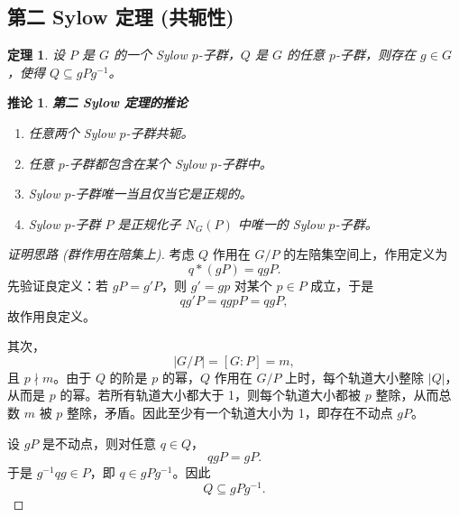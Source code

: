 \documentclass[11pt,a4paper]{ctexart}
\newtheorem*{theorem}{定理}
\newtheorem*{corollary}{推论}
\theoremstyle{remark}
\begin{document}
\subsection*{第二 Sylow 定理 (共轭性)}
\begin{theorem}
设 \(P\) 是 \(G\) 的一个 Sylow \(p\)-子群，\(Q\) 是 \(G\) 的任意 \(p\)-子群，则存在 \(g \in G\)，使得 \(Q \subseteq gPg^{-1}\)。
\end{theorem}
\begin{corollary}\textbf{第二 Sylow 定理的推论}
\begin{enumerate}
    \item 任意两个 Sylow \(p\)-子群共轭。
    \item 任意 \(p\)-子群都包含在某个 Sylow \(p\)-子群中。
    \item Sylow \(p\)-子群唯一当且仅当它是正规的。
    \item Sylow \(p\)-子群 \(P\) 是正规化子 \(N_G(P)\) 中唯一的 Sylow \(p\)-子群。
\end{enumerate}
\end{corollary}
\begin{proof}[证明思路 (群作用在陪集上)]
考虑 \(Q\) 作用在 \(G/P\) 的左陪集空间上，作用定义为
\[
q * (gP) = qgP.
\]
先验证良定义：若 \(gP=g'P\)，则 \(g'=gp\) 对某个 \(p\in P\) 成立，于是
\[
q g'P = q g p P = q g P,
\]
故作用良定义。

其次，
\[
|G/P| = [G:P] = m,
\]
且 \(p\nmid m\)。由于 \(Q\) 的阶是 \(p\) 的幂，\(Q\) 作用在 \(G/P\) 上时，每个轨道大小整除 \(|Q|\)，从而是 \(p\) 的幂。若所有轨道大小都大于 1，则每个轨道大小都被 \(p\) 整除，从而总数 \(m\) 被 \(p\) 整除，矛盾。因此至少有一个轨道大小为 1，即存在不动点 \(gP\)。

设 \(gP\) 是不动点，则对任意 \(q\in Q\)，
\[
qgP = gP.
\]
于是 \(g^{-1}qg\in P\)，即 \(q\in gPg^{-1}\)。因此
\[
Q \subseteq gPg^{-1}.
\]
\end{proof}
\end{document}
